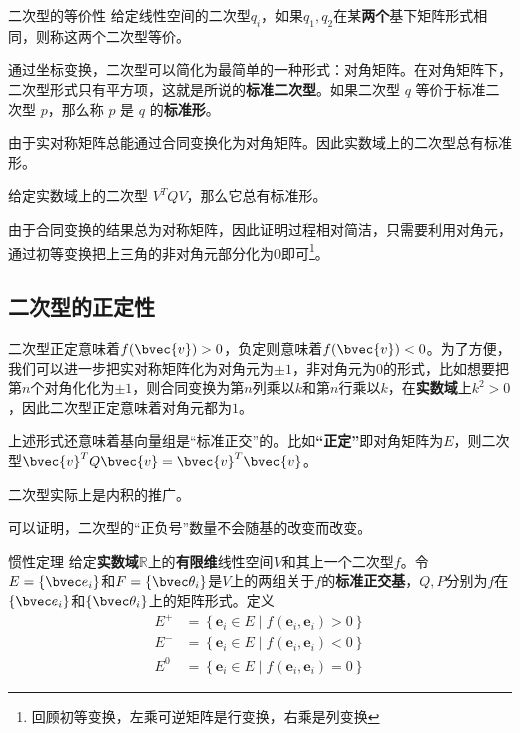 \begin{definition}{二次型的等价性}
给定线性空间的二次型$q_i$，如果$q_1,q_2$在某\textbf{两个}基下矩阵形式相同，则称这两个二次型等价。
\end{definition}

通过坐标变换，二次型可以简化为最简单的一种形式：对角矩阵。在对角矩阵下，二次型形式只有平方项，这就是所说的\textbf{标准二次型}。如果二次型 $q$
等价于标准二次型 $p$，那么称 $p$ 是 $q$ 的\textbf{标准形}。

由于实对称矩阵总能通过合同变换化为对角矩阵。因此实数域上的二次型总有标准形。
\begin{theorem}{}
给定实数域上的二次型 $V^T QV$，那么它总有标准形。
\end{theorem}
由于合同变换的结果总为对称矩阵，因此证明过程相对简洁，只需要利用对角元，通过初等变换把上三角的非对角元部分化为0即可\footnote{回顾初等变换，左乘可逆矩阵是行变换，右乘是列变换}。
\subsection{二次型的正定性}
二次型正定意味着$f(\bvec{v})>0$，负定则意味着$f(\bvec{v})< 0$。为了方便，我们可以进一步把实对称矩阵化为对角元为$\pm 1$，非对角元为$0$的形式，比如想要把第$n$个对角化化为$\pm 1$，则合同变换为第$n$列乘以$k$和第$n$行乘以$k$，在\textbf{实数域}上$k^2>0$，因此二次型正定意味着对角元都为$1$。

上述形式还意味着基向量组是“标准正交”的。比如\textbf{“正定”}即对角矩阵为$E$，则二次型$\bvec{v}^{T}Q\bvec{v}=\bvec{v}^{T}\bvec{v}$。

二次型实际上是内积的推广。

可以证明，二次型的“正负号”数量不会随基的改变而改变。
\begin{theorem}{惯性定理}
给定\textbf{实数域}$\mathbb R$上的\textbf{有限维}线性空间$V$和其上一个二次型$f$。令$E=\{\bvec e_i\}$和$F=\{\bvec \theta_i\}$是$V$上的两组关于$f$的\textbf{标准正交基}，$Q,P$分别为$f$在$\{\bvec e_i\}$和$\{\bvec \theta_i\}$上的矩阵形式。定义
\begin{equation}
\begin{aligned}
E^{+} & =\left\{\mathbf{e}_i \in E \mid f\left(\mathbf{e}_i, \mathbf{e}_i\right)>0\right\} \\
E^{-} & =\left\{\mathbf{e}_i \in E \mid f\left(\mathbf{e}_i, \mathbf{e}_i\right)<0\right\} \\
E^0 & =\left\{\mathbf{e}_i \in E \mid f\left(\mathbf{e}_i, \mathbf{e}_i\right)=0\right\}
\end{aligned}
\end{equation}
\end{theorem}